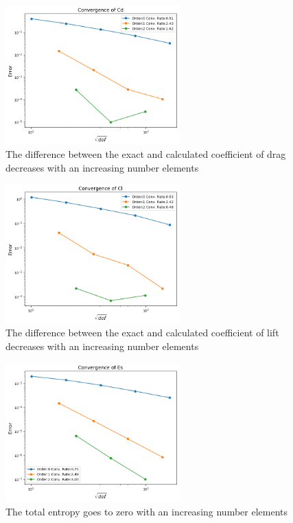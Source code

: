 \documentclass{article}
\begin{document}
\begin{figure}[H]
	\centering
	\includegraphics[width=0.60\textwidth,keepaspectratio]{conv_cd.png}
	\caption{The difference between the exact and calculated coefficient of drag decreases with an increasing number elements}
	\label{fig:conv_cl}
\end{figure}
\begin{figure}[H]
	\centering
	\includegraphics[width=0.60\textwidth,keepaspectratio]{conv_cl.png}
	\caption{The difference between the exact and calculated coefficient of lift decreases with an increasing number elements}
	\label{fig:conv_cd}
\end{figure}
\begin{figure}[H]
	\centering
	\includegraphics[width=0.60\textwidth,keepaspectratio]{conv_Es.png}
	\caption{The total entropy goes to zero with an increasing number elements}
	\label{fig:conv_Es}
\end{figure}
\end{document}
